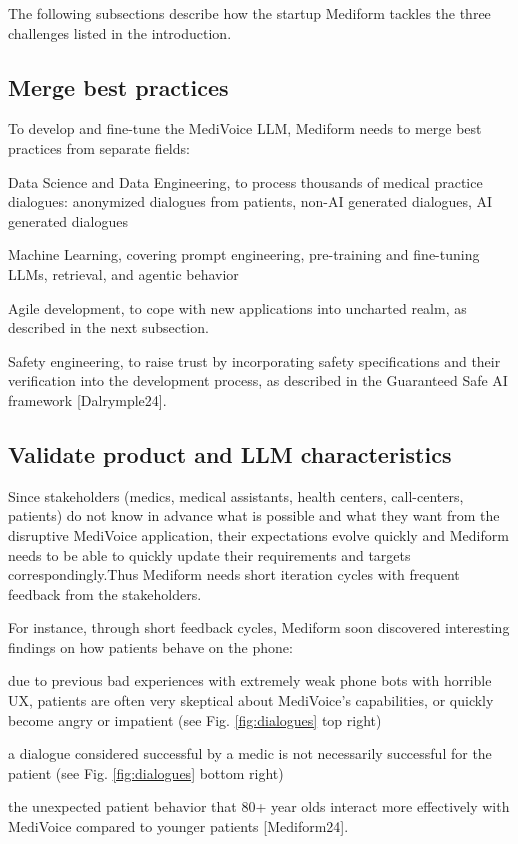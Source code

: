 \documentclass[twocolumn]{article}
\begin{document}
The following subsections describe how the startup Mediform tackles the three challenges listed in the introduction. 

\subsection{Merge best practices}

To develop and fine-tune the MediVoice LLM, Mediform needs to merge best practices from separate fields:
\begin{compactitem}
\item Data Science and Data Engineering, to process thousands of medical practice dialogues: anonymized dialogues from patients, non-AI generated dialogues, AI generated dialogues
\item Machine Learning, covering prompt engineering, pre-training and fine-tuning LLMs, retrieval, and agentic behavior
\item Agile development, to cope with new applications into uncharted realm, as described in the next subsection.
\item Safety engineering, to raise trust by incorporating safety specifications and their verification into the development process,
  as described in the Guaranteed Safe AI framework [Dalrymple24].
\end{compactitem}

\subsection{Validate product and LLM characteristics}

Since stakeholders (medics, medical assistants, health centers, call-centers, patients) do not know in advance what is possible and what they want from the disruptive MediVoice application, their expectations evolve quickly and Mediform needs to be able to quickly update their requirements and targets correspondingly.Thus Mediform needs short iteration cycles with frequent feedback from the stakeholders. 

For instance, through short feedback cycles, Mediform soon discovered interesting findings on how patients behave on the phone:
\begin{compactitem}
\item due to previous bad experiences with extremely weak phone bots with horrible UX, patients are often very skeptical about MediVoice’s capabilities, or quickly become angry or impatient  (see Fig. \ref{fig:dialogues} top right)
\item a dialogue considered successful by a medic is not necessarily successful for the patient (see Fig. \ref{fig:dialogues} bottom right)
\item the unexpected patient behavior that 80+ year olds interact more effectively with MediVoice compared to younger patients [Mediform24].
\end{compactitem}
\end{document}
